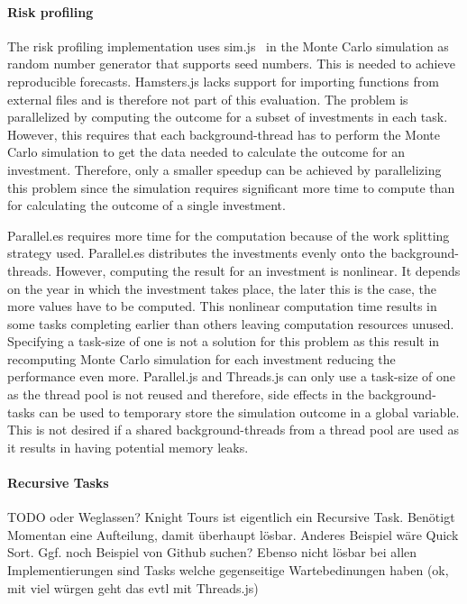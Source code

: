 \paragraph{Risk profiling}
The risk profiling implementation uses sim.js~\cite{simjs} in the Monte Carlo simulation as random number generator that supports seed numbers. This is needed to achieve reproducible forecasts. Hamsters.js lacks support for importing functions from external files and is therefore not part of this evaluation. The problem is parallelized by computing the outcome for a subset of investments in each task. However, this requires that each background-thread has to perform the Monte Carlo simulation to get the data needed to calculate the outcome for an investment. Therefore, only a smaller speedup can be achieved by parallelizing this problem since the simulation requires significant more time to compute than for calculating the outcome of a single investment. 

Parallel.es requires more time for the computation because of the work splitting strategy used. Parallel.es distributes the investments evenly onto the background-threads. However, computing the result for an investment is nonlinear. It depends on the year in which the investment takes place, the later this is the case, the more values have to be computed. This nonlinear computation time results in some tasks completing earlier than others leaving computation resources unused. Specifying a task-size of one is not a solution for this problem as this result in recomputing Monte Carlo simulation for each investment reducing the performance even more. Parallel.js and Threads.js can only use a task-size of one as the thread pool is not reused and therefore, side effects in the background-tasks can be used to temporary store the simulation outcome in a global variable. This is not desired if a shared background-threads from a thread pool are used as it results in having potential memory leaks.

\paragraph{Recursive Tasks}
TODO oder Weglassen? Knight Tours ist eigentlich ein Recursive Task. Benötigt Momentan eine Aufteilung, damit überhaupt lösbar. Anderes Beispiel wäre Quick Sort. Ggf. noch Beispiel von Github suchen? Ebenso nicht lösbar bei allen Implementierungen sind Tasks welche gegenseitige Wartebedinungen haben (ok, mit viel würgen geht das evtl mit Threads.js)
